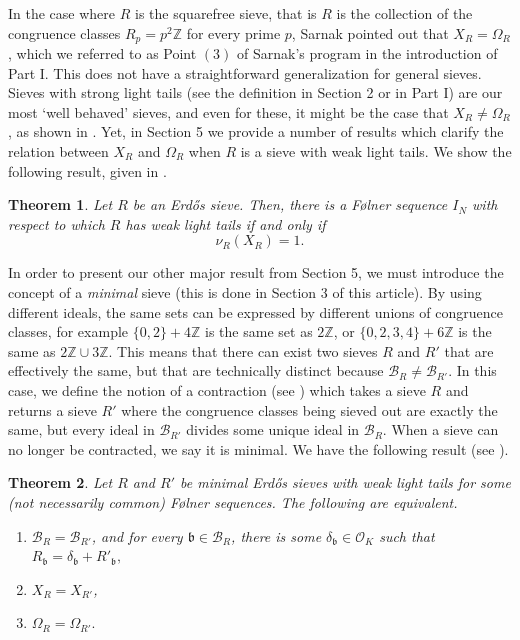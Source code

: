\documentclass[a4paper,11pt,reqno]{amsart}
\theoremstyle{plain}
\newtheorem{theorem}{Theorem}[section]
\theoremstyle{remark}
\newcommand{\z}{\mathbb{Z}}
\newcommand{\cb}{\mathcal{B}}
\newcommand{\co}{\mathcal{O}}
\newcommand{\gb}{\mathfrak{b}}
\begin{document}
	In the case where $R$ is the squarefree sieve, that is $R$ is the collection of the congruence classes $R_p = p^2\z$ for every prime $p$, Sarnak pointed out that $X_R = \Omega_{R}$, which we referred to as Point $(3)$ of Sarnak's program in the introduction of Part I.  This does not have a straightforward generalization for general sieves. Sieves with strong light tails (see the definition in Section 2 or in Part I) are our most `well behaved' sieves, and even for these, it might be the case that $X_R \neq \Omega_{R}$, as shown in . Yet, in Section 5 we provide a number of results which clarify the relation between $X_R$ and $\Omega_{R}$ when $R$ is a sieve with weak light tails. We show the following result, given in .
	
	\begin{theorem}
		\label{thm: intro nuR XR equal 1}
		Let $R$ be an Erdős sieve. Then, there is a Følner sequence $I_N$ with respect to which $R$ has weak light tails if and only if $$\nu_R(X_R) = 1.$$
		
	\end{theorem}
	
	In order to present our other major result from Section 5, we must introduce the concept of a \textit{minimal} sieve (this is done in Section 3 of this article). By using different ideals, the same sets can be expressed by different unions of congruence classes, for example $\{0,2\}+4\z$ is the same set as $2\z$, or $\{0,2,3,4\}+6\z$ is the same as $2\z \cup 3\z$. This means that there can exist two sieves $R$ and $R'$ that are effectively the same, but that are technically distinct because $\cb_R \neq \cb_{R'}$. In this case, we define the notion of a contraction (see ) which takes a sieve $R$ and returns a sieve $R'$ where the congruence classes being sieved out are exactly the same, but every ideal in $\cb_{R'}$  divides some unique ideal in $\cb_R$. When a sieve can no longer be contracted, we say it is minimal. We have the following result (see ).
	
	\begin{theorem}
		\label{thm: intro XR equal XRp implies OmegaR equal OmegaRp}
		Let $R$ and $R'$ be minimal Erdős sieves with weak light tails for some (not necessarily common) Følner sequences. The following are equivalent. 
		
		\begin{enumerate}
			\item $\cb_R = \cb_{R'}$, and for every $\gb \in \cb_R$, there is some $\delta_\gb\in \co_K$ such that $R_\gb = \delta_\gb+ R'_\gb,$ 
			\item $X_R = X_{R'}$,
			\item $\Omega_{R} = \Omega_{R'}.$
		\end{enumerate} 
	\end{theorem}
	
\end{document}
